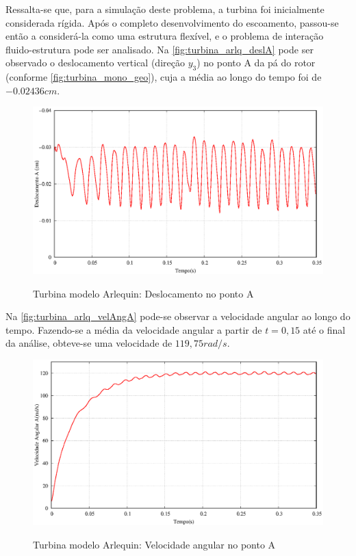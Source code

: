 Ressalta-se que, para a simulação deste problema, a turbina foi inicialmente considerada rígida. Após o completo desenvolvimento do escoamento, passou-se então a considerá-la como uma estrutura flexível, e o problema de interação fluido-estrutura pode ser analisado. Na \autoref{fig:turbina_arlq_deslA} pode ser observado o deslocamento vertical (direção $y_3$) no ponto A da pá do rotor (conforme \autoref{fig:turbina_mono_geo}), cuja a média ao longo do tempo foi de $-0.02436cm$.

\begin{figure}[!htbp]
	\caption{Turbina modelo Arlequin: Deslocamento no ponto A}
	\centering 
	\includegraphics[scale=0.6,trim=0cm 0cm 0cm 0cm, clip=true]{Imagens/Cap7/turbina_arlq_deslocamento.eps}	
	\label{fig:turbina_arlq_deslA}
\end{figure}

Na \autoref{fig:turbina_arlq_velAngA} pode-se observar a velocidade angular ao longo do tempo. Fazendo-se a média da velocidade angular a partir de $t=0,15$ até o final da análise, obteve-se uma velocidade de  $119,75rad/s$.

\begin{figure}[!htbp]
	\caption{Turbina modelo Arlequin: Velocidade angular no ponto A}
	\centering 
	\includegraphics[scale=0.6,trim=0cm 0cm 0cm 0cm, clip=true]{Imagens/Cap7/turbina_arlq_velocidade_angular.eps}	
	\label{fig:turbina_arlq_velAngA}
\end{figure}

